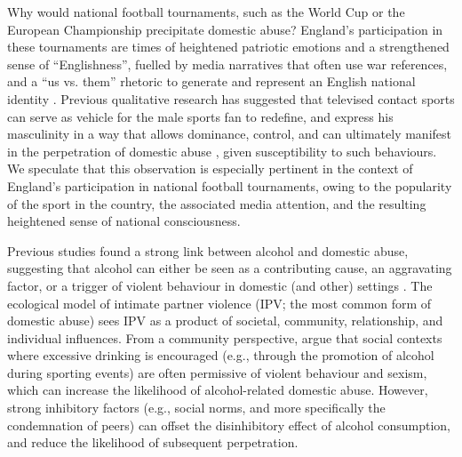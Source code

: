 \documentclass[12pt, a4paper]{article}
\begin{document}
Why would national football tournaments, such as the World Cup or the European Championship precipitate domestic abuse? England's participation in these tournaments are times of heightened patriotic emotions and a strengthened sense of ``Englishness'', fuelled by media narratives that often use war references, and a ``us vs. them'' rhetoric to generate and represent an English national identity \cite{Vincent2014}. Previous qualitative research has suggested that televised contact sports can serve as vehicle for the male sports fan to redefine, and express his masculinity in a way that allows dominance, control, and can ultimately manifest in the perpetration of domestic abuse \cite{Sabo,Swallow}, given susceptibility to such behaviours. We speculate that this observation is especially pertinent in the context of England's participation in national football tournaments, owing to the popularity of the sport in the country, the associated media attention, and the resulting heightened sense of national consciousness.


Previous studies found a strong link between alcohol and domestic abuse, suggesting that alcohol can either be seen as a contributing cause, an aggravating factor, or a trigger of violent behaviour in domestic (and other) settings \cite{Leonard2017}. The ecological model of intimate partner violence (IPV; the most common form of domestic abuse) sees IPV as a product of societal, community, relationship, and individual influences. From a community perspective, \cite{Graham2017} argue that social contexts where excessive drinking is encouraged (e.g., through the promotion of alcohol during sporting events) are often permissive of violent behaviour and sexism, which can increase the likelihood of alcohol-related domestic abuse. However, strong inhibitory factors (e.g., social norms, and more specifically the condemnation of peers) can offset the disinhibitory effect of alcohol consumption, and reduce the likelihood of subsequent perpetration.  

\end{document}
